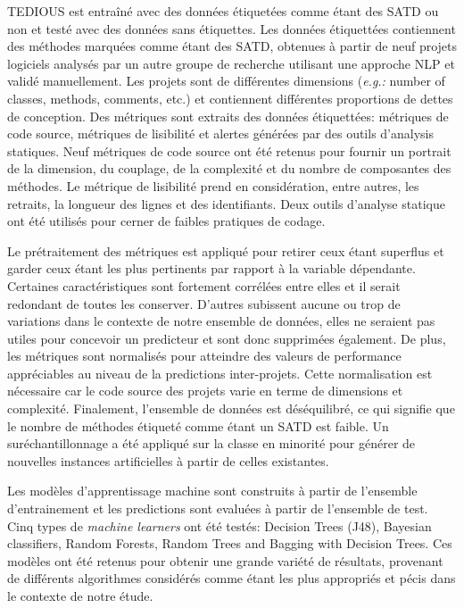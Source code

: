 \ac{TEDIOUS} est entra\^{i}n\'{e} avec des donn\'{e}es \'{e}tiquet\'{e}es comme \'{e}tant des \ac{SATD} ou non et test\'{e} avec des donn\'{e}es sans \'{e}tiquettes. Les donn\'{e}es \'{e}tiquett\'{e}es contiennent des m\'{e}thodes marqu\'{e}es comme \'{e}tant des \ac{SATD}, obtenues \`{a} partir de neuf projets logiciels analys\'{e}s par un autre groupe de recherche utilisant une approche \ac{NLP} et valid\'{e} manuellement. Les projets sont de diff\'{e}rentes dimensions (\emph{e.g.:} number of classes, methods, comments, etc.) et contiennent diff\'{e}rentes proportions de dettes de conception. Des m\'{e}triques sont extraits des donn\'{e}es \'{e}tiquett\'{e}es: m\'{e}triques de code source, m\'{e}triques de lisibilit\'{e} et alertes g\'{e}n\'{e}r\'{e}es par des outils d'analysis statiques. Neuf m\'{e}triques de code source ont \'{e}t\'{e} retenus pour fournir un portrait de la dimension, du couplage, de la complexit\'{e} et du nombre de composantes des m\'{e}thodes. Le m\'{e}trique de lisibilit\'{e} prend en consid\'{e}ration, entre autres, les retraits, la longueur des lignes et des identifiants. Deux outils d'analyse statique ont \'{e}t\'{e} utilis\'{e}s pour cerner de faibles pratiques de codage. \par

Le pr\'{e}traitement des m\'{e}triques est appliqu\'{e} pour retirer ceux \'{e}tant superflus et garder ceux \'{e}tant les plus pertinents par rapport \`{a} la variable d\'{e}pendante. Certaines caract\'{e}ristiques sont fortement corr\'{e}l\'{e}es entre elles et il serait redondant de toutes les conserver. D'autres subissent aucune ou trop de variations dans le contexte de notre ensemble de donn\'{e}es, elles ne seraient pas utiles pour concevoir un predicteur et sont donc supprim\'{e}es \'{e}galement. De plus, les m\'{e}triques sont normalis\'{e}s pour atteindre des valeurs de performance appr\'{e}ciables au niveau de la predictions inter-projets. Cette normalisation est n\'{e}cessaire car le code source des projets varie en terme de dimensions et complexit\'{e}. Finalement, l'ensemble de donn\'{e}es est d\'{e}s\'{e}quilibr\'{e}, ce qui signifie que le nombre de m\'{e}thodes \'{e}tiquet\'{e} comme \'{e}tant un \ac{SATD} est faible. Un sur\'{e}chantillonnage a \'{e}t\'{e} appliqu\'{e} sur la classe en minorit\'{e} pour g\'{e}n\'{e}rer de nouvelles instances artificielles \`{a} partir de celles existantes. \par

Les mod\`{e}les d'apprentissage machine sont construits \`{a} partir de l'ensemble d'entrainement et les predictions sont evalu\'{e}es \`{a} partir de l'ensemble de test. Cinq types de \emph{machine learners} ont \'{e}t\'{e} test\'{e}s: Decision Trees (J48), Bayesian classifiers, Random Forests, Random Trees and Bagging with Decision Trees. Ces mod\`{e}les ont \'{e}t\'{e} retenus pour obtenir une grande vari\'{e}t\'{e} de r\'{e}sultats, provenant de diff\'{e}rents algorithmes consid\'{e}r\'{e}s comme \'{e}tant les plus appropri\'{e}s et p\'{e}cis dans le contexte de notre \'{e}tude. \par

